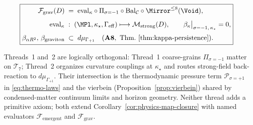 \begin{equation}\label{eq:thread-2-pipeline}
  \boxed{%
  \begin{aligned}
    \mathcal{F}_{\mathrm{grav}}(D)
    \;&=\;
    \mathrm{eval}_{\kappa}\circ
    \Pi_{\sigma=-1}\circ
    \mathrm{Bal}_{\mathcal{C}}\circ
    \Mirror^{\leq 8}(\Void),\\[4pt]
    \mathrm{eval}_{\kappa}
    \;&:\;
    (\MPl,\kappa_\star,\Gamma_{\mathrm{eff}})
    \longmapsto
    \mathcal{M}_{\mathrm{strong}}(D),
    \qquad
    \beta_\kappa\big|_{\sigma=-1,\,\kappa_\star}=0,\\[2pt]
    \beta_{\alpha R^2},\,
    \beta_{\mathrm{graviton}}
    \;&\subset\;
    d\mu_{\Gamma_{+1}}
    \quad
    (\textbf{A8},\ \text{Thm.~\ref{thm:kappa-persistence}}).
  \end{aligned}}
\end{equation}

\begin{remark}
\label{rmk:threads-1-2-coupling}
Threads~1 and~2 are logically orthogonal: Thread~1 coarse-grains
$\Pi_{\sigma=-1}$ matter on $\mathcal{T}_7$; Thread~2 organizes
curvature couplings at $\kappa_\star$ and routes strong-field back-reaction
to $d\mu_{\Gamma_{+1}}$. Their intersection is the thermodynamic pressure
term $\mathcal{P}_{\sigma=+1}$ in \eqref{eq:thermo-laws} and the vierbein
(Proposition~\ref{prop:vierbein}) shared by condensed-matter continuum
limits and horizon geometry. Neither thread adds a primitive axiom; both
extend Corollary~\ref{cor:physics-map-closure} with named evaluators
$\mathcal{F}_{\mathrm{emergent}}$ and $\mathcal{F}_{\mathrm{grav}}$.
\end{remark}